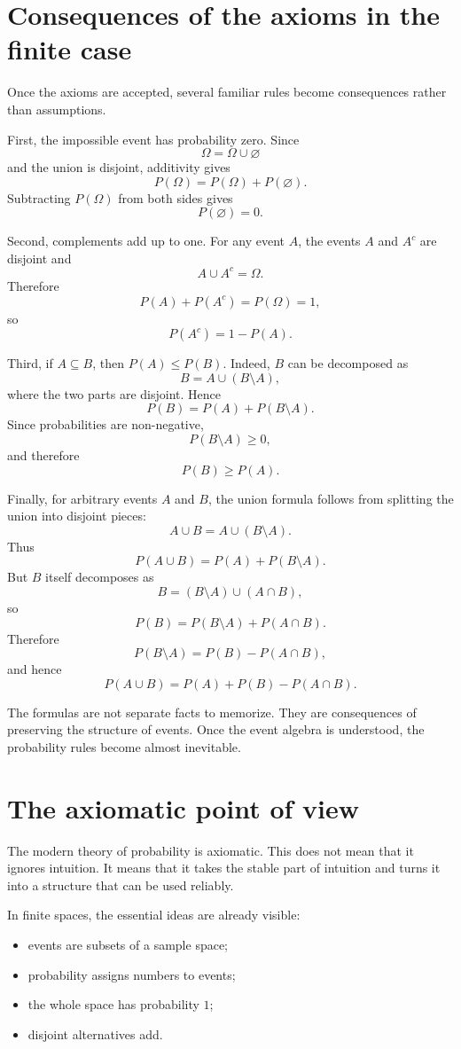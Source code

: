 \section{Consequences of the axioms in the finite case}

Once the axioms are accepted, several familiar rules become consequences rather than assumptions.

First, the impossible event has probability zero. Since
\[
\Omega=\Omega\cup\varnothing
\]
and the union is disjoint, additivity gives
\[
P(\Omega)=P(\Omega)+P(\varnothing).
\]
Subtracting \(P(\Omega)\) from both sides gives
\[
P(\varnothing)=0.
\]

Second, complements add up to one. For any event \(A\), the events \(A\) and \(A^c\) are disjoint and
\[
A\cup A^c=\Omega.
\]
Therefore
\[
P(A)+P(A^c)=P(\Omega)=1,
\]
so
\[
P(A^c)=1-P(A).
\]

Third, if \(A\subseteq B\), then \(P(A)\leq P(B)\). Indeed, \(B\) can be decomposed as
\[
B=A\cup(B\setminus A),
\]
where the two parts are disjoint. Hence
\[
P(B)=P(A)+P(B\setminus A).
\]
Since probabilities are non-negative,
\[
P(B\setminus A)\geq 0,
\]
and therefore
\[
P(B)\geq P(A).
\]

Finally, for arbitrary events \(A\) and \(B\), the union formula follows from splitting the union into disjoint pieces:
\[
A\cup B=A\cup(B\setminus A).
\]
Thus
\[
P(A\cup B)=P(A)+P(B\setminus A).
\]
But \(B\) itself decomposes as
\[
B=(B\setminus A)\cup(A\cap B),
\]
so
\[
P(B)=P(B\setminus A)+P(A\cap B).
\]
Therefore
\[
P(B\setminus A)=P(B)-P(A\cap B),
\]
and hence
\[
P(A\cup B)=P(A)+P(B)-P(A\cap B).
\]

\begin{remarkbox}
The formulas are not separate facts to memorize. They are consequences of preserving the structure of events. Once the event algebra is understood, the probability rules become almost inevitable.
\end{remarkbox}

\section{The axiomatic point of view}

The modern theory of probability is axiomatic. This does not mean that it ignores intuition. It means that it takes the stable part of intuition and turns it into a structure that can be used reliably.

In finite spaces, the essential ideas are already visible:
\begin{itemize}
    \item events are subsets of a sample space;
    \item probability assigns numbers to events;
    \item the whole space has probability \(1\);
    \item disjoint alternatives add.
\end{itemize}

